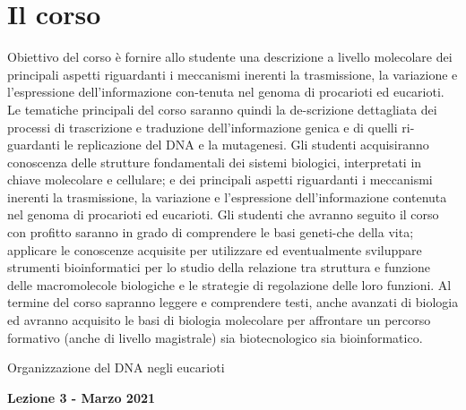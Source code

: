 \documentclass{article}
\begin{document}
\section{Il corso}
    Obiettivo del corso è fornire allo studente una descrizione a livello molecolare dei principali aspetti riguardanti i meccanismi inerenti la trasmissione, 
    la variazione e l'espressione dell'informazione con-tenuta nel genoma di procarioti ed eucarioti. Le tematiche principali del corso saranno quindi la de-scrizione dettagliata dei processi di trascrizione 
    e traduzione dell'informazione genica e di quelli ri-guardanti le replicazione del DNA e la mutagenesi. Gli studenti acquisiranno conoscenza delle strutture fondamentali dei sistemi biologici, 
    interpretati in chiave molecolare e cellulare; e dei principali aspetti riguardanti i meccanismi inerenti la trasmissione, la variazione e l'espressione dell'informazione contenuta nel genoma di procarioti ed eucarioti. 
    Gli studenti che avranno seguito il corso con profitto saranno in grado di comprendere le basi geneti-che della vita; applicare le conoscenze acquisite per utilizzare ed eventualmente sviluppare strumenti bioinformatici 
    per lo studio della relazione tra struttura e funzione delle macromolecole biologiche e le strategie di regolazione delle loro funzioni. Al termine del corso sapranno leggere e comprendere testi, anche avanzati di biologia 
    ed avranno acquisito le basi di biologia molecolare per affrontare un percorso formativo (anche di livello magistrale) sia biotecnologico sia bioinformatico.
\begin{titlepage}
    \begin{center}
        \vspace*{1cm}
        \LARGE
        Organizzazione del DNA negli eucarioti
            
        \vspace{1.5cm}
        
        \Large
        \textbf{Lezione 3 - Marzo 2021}

        \vspace{0.8cm}

    \end{center}
\end{titlepage}
\end{document}
